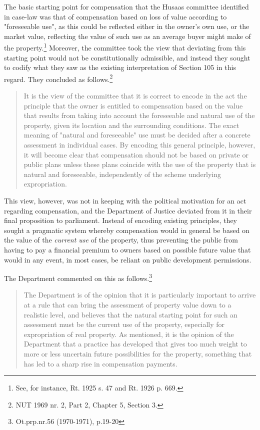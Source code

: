 The basic starting point for compensation that the Husaas committee identified in case-law was that of compensation based on loss of value according to "foreseeable use", as this could be reflected either in the owner's own use, or the market value, reflecting the value of such use as an average buyer might make of the property.\footnote{See, for instance, Rt. 1925 s. 47 and Rt. 1926 p. 669.} Moreover, the committee took the view that deviating from this starting point would not be constitutionally admissible, and instead they sought to codify what they saw as the existing interpretation of Section 105 in this regard. They concluded as follows.\footnote{NUT 1969 nr. 2, Part 2, Chapter 5, Section 3.}

\begin{quote}
It is the view of the committee that it is correct to encode in the act the principle that the owner is entitled to compensation based on the value that results from taking into account the foreseeable and natural use of the property, given its location and the surrounding conditions. The exact meaning of "natural and foreseeable" use must be decided after a concrete assessment in individual cases. By encoding this general principle, however, it will become clear that compensation should not be based on private or public plans unless these plans coincide with the use of the property that is natural and foreseeable, independently of the scheme underlying expropriation.
\end{quote}

This view, however, was not in keeping with the political motivation for an act regarding compensation, and the Department of Justice deviated from it in their final proposition to parliament. Instead of encoding existing  principles, they sought a pragmatic system whereby compensation would in general be based on the value of the \emph{current use} of the property, thus preventing the public from having to pay a financial premium to owners based on possible future value that would in any event, in most cases, be reliant on public development permissions. %

The Department commented on this as follows.\footnote{Ot.prp.nr.56 (1970-1971), p.19-20}

\begin{quote}
The Department is of the opinion that it is particularly important to arrive at a rule that can bring the assessment of property value down to a realistic level, and believes that the natural starting point for such an assessment must be the current use of the property, especially for expropriation of real property. As mentioned, it is the opinion of the Department that a practice has developed that gives too much weight to more or less uncertain future possibilities for the property, something that has led to a sharp rise in compensation payments.
\end{quote}

